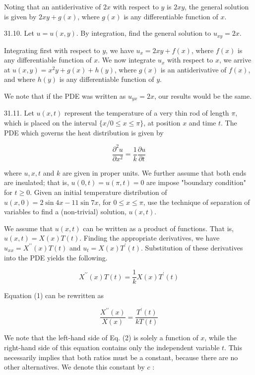 \documentclass[10pt]{article}
\begin{document}
Noting that an antiderivative of $2 x$ with respect to $y$ is $2 x y$, the general solution is given by $2 x y+g(x)$, where $g(x)$ is any differentiable function of $x$.

31.10. Let $u=u(x, y)$. By integration, find the general solution to $u_{x y}=2 x$.

Integrating first with respect to $y$, we have $u_{x}=2 x y+f(x)$, where $f(x)$ is any differentiable function of $x$. We now integrate $u_{x}$ with respect to $x$, we arrive at $u(x, y)=x^{2} y+g(x)+h(y)$, where $g(x)$ is an antiderivative of $f(x)$, and where $h(y)$ is any differentiable function of $y$.

We note that if the PDE was written as $u_{y x}=2 x$, our results would be the same.

31.11. Let $u(x, t)$ represent the temperature of a very thin rod of length $\pi$, which is placed on the interval $\{x / 0 \leq x \leq \pi\}$, at position $x$ and time $t$. The PDE which governs the heat distribution is given by

$$
\frac{\partial^{2} u}{\partial x^{2}}=\frac{1}{k} \frac{\partial u}{\partial t}
$$

where $u, x, t$ and $k$ are given in proper units. We further assume that both ends are insulated; that is, $u(0, t)=u(\pi, t)=0$ are impose "boundary condition" for $t \geq 0$. Given an initial temperature distribution of $u(x, 0)=2 \sin 4 x-11 \sin 7 x$, for $0 \leq x \leq \pi$, use the technique of separation of variables to find a (non-trivial) solution, $u(x, t)$.

We assume that $u(x, t)$ can be written as a product of functions. That is, $u(x, t)=X(x) T(t)$. Finding the appropriate derivatives, we have $u_{x x}=X^{\prime \prime}(x) T(t)$ and $u_{t}=X(x) T^{\prime}(t)$. Substitution of these derivatives into the PDE yields the following.


\begin{equation*}
X^{\prime \prime}(x) T(t)=\frac{1}{k} X(x) T^{\prime}(t) \tag{1}
\end{equation*}


Equation (1) can be rewritten as


\begin{equation*}
\frac{X^{\prime \prime}(x)}{X(x)}=\frac{T^{\prime}(t)}{k T(t)} \tag{2}
\end{equation*}


We note that the left-hand side of Eq. (2) is solely a function of $x$, while the right-hand side of this equation contains only the independent variable $t$. This necessarily implies that both ratios must be a constant, because there are no other alternatives. We denote this constant by $c$ :
\end{document}
